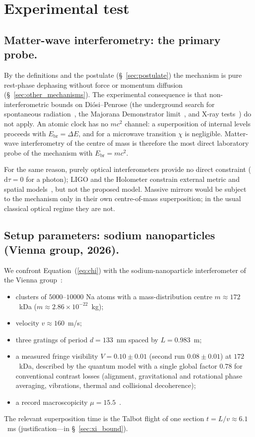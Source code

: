 \documentclass[11pt,a4paper]{article}
\begin{document}
\section{Experimental test}\label{sec:experiment}

\subsection{Matter-wave interferometry: the primary probe.}
\label{sec:matter_interferometry}

By the definitions and the postulate (\S~\ref{sec:postulate}) the mechanism is pure rest-phase dephasing without force or momentum diffusion (\S~\ref{sec:other_mechanisms}). The experimental consequence is that non-interferometric bounds on Di\'osi--Penrose (the underground search for spontaneous radiation~\cite{donadi2021}, the Majorana Demonstrator limit~\cite{majorana2022}, and X-ray tests~\cite{piscicchia2024}) do not apply. An atomic clock has no $mc^2$ channel: a superposition of internal levels proceeds with $E_{\mathrm{br}}=\Delta E$, and for a microwave transition $\chi$ is negligible. Matter-wave interferometry of the centre of mass is therefore the most direct laboratory probe of the mechanism with $E_{\mathrm{br}}=mc^2$.

For the same reason, purely optical interferometers provide no direct constraint ($\mathrm d\tau=0$ for a photon); LIGO and the Holometer constrain external metric and spatial models~\cite{chou2017holometer}, but not the proposed model. Massive mirrors would be subject to the mechanism only in their own centre-of-mass superposition; in the usual classical optical regime they are not.

\subsection{Setup parameters: sodium nanoparticles (Vienna group, 2026).}
\label{sec:na_vienna}

We confront Equation~(\ref{eq:chi}) with the sodium-nanoparticle interferometer of the Vienna group~\cite{arndt2025,arndt_arxiv}:
\begin{itemize}
\item clusters of $5000$--$10000$ Na atoms with a mass-distribution centre $m\approx 172$~kDa ($m\approx 2.86\times10^{-22}$~kg);
\item velocity $v\approx 160$~m/s;
\item three gratings of period $d=133$~nm spaced by $L=0.983$~m;
\item a measured fringe visibility $V=0.10\pm0.01$ (second run $0.08\pm0.01$) at $172$~kDa, described by the quantum model with a single global factor $0.78$ for conventional contrast losses (alignment, gravitational and rotational phase averaging, vibrations, thermal and collisional decoherence);
\item a record macroscopicity $\mu=15.5$~\cite{macroscopicity,arndt2025}.
\end{itemize}
The relevant superposition time is the Talbot flight of one section $t=L/v\approx 6.1$~ms (justification---in \S~\ref{sec:xi_bound}).
\end{document}
